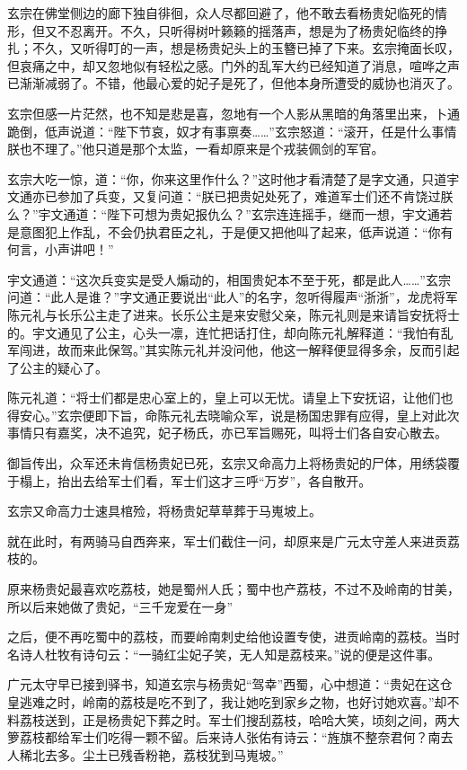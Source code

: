 \documentclass[12pt,oneside]{book}
\begin{document}
玄宗在佛堂侧边的廊下独自徘徊，众人尽都回避了，他不敢去看杨贵妃临死的情形，但又不忍离开。不久，只听得树叶籁籁的摇落声，想是为了杨贵妃临终的挣扎；不久，又听得叮的一声，想是杨贵妃头上的玉簪已掉了下来。玄宗掩面长叹，但哀痛之中，却又忽地似有轻松之感。门外的乱军大约已经知道了消息，喧哗之声已渐渐减弱了。不错，他最心爱的妃子是死了，但他本身所遭受的威协也消灭了。

玄宗但感一片茫然，也不知是悲是喜，忽地有一个人影从黑暗的角落里出来，卜通跪倒，低声说道：``陛下节哀，奴才有事禀奏\ldots\ldots{}''玄宗怒道：``滚开，任是什么事情朕也不理了。''他只道是那个太监，一看却原来是个戎装佩剑的军官。

玄宗大吃一惊，道：``你，你来这里作什么？''这时他才看清楚了是字文通，只道宇文通亦已参加了兵变，又复问道：``朕已把贵妃处死了，难道军士们还不肯饶过朕么？''宇文通道：``陛下可想为贵妃报仇么？''玄宗连连摇手，继而一想，宇文通若是意图犯上作乱，不会仍执君臣之礼，于是便又把他叫了起来，低声说道：``你有何言，小声讲吧！''

宇文通道：``这次兵变实是受人煽动的，相国贵妃本不至于死，都是此人\ldots\ldots{}''玄宗问道：``此人是谁？''字文通正要说出``此人''的名字，忽听得履声``浙浙''，龙虎将军陈元礼与长乐公主走了进来。长乐公主是来安慰父亲，陈元礼则是来请旨安抚将士的。宇文通见了公主，心头一凛，连忙把话打住，却向陈元礼解释道：``我怕有乱军闯进，故而来此保驾。''其实陈元礼并没问他，他这一解释便显得多余，反而引起了公主的疑心了。

陈元礼道：``将士们都是忠心室上的，皇上可以无忧。请皇上下安抚诏，让他们也得安心。''玄宗便即下旨，命陈元礼去晓喻众军，说是杨国忠罪有应得，皇上对此次事情只有嘉奖，决不追究，妃子杨氏，亦已军旨赐死，叫将士们各自安心散去。

御旨传出，众军还未肯信杨贵妃已死，玄宗又命高力上将杨贵妃的尸体，用绣袋覆于榻上，抬出去给军士们看，军士们这才三呼``万岁''，各自散开。

玄宗又命高力士速具棺殓，将杨贵妃草草葬于马嵬坡上。

就在此时，有两骑马自西奔来，军士们截住一问，却原来是广元太守差人来进贡荔枝的。

原来杨贵妃最喜欢吃荔枝，她是蜀州人氏；蜀中也产荔枝，不过不及岭南的甘美，所以后来她做了贵妃，``三千宠爱在一身''

之后，便不再吃蜀中的荔枝，而要岭南刺史给他设置专使，进贡岭南的荔枝。当时名诗人杜牧有诗句云：``一骑红尘妃子笑，无人知是荔枝来。''说的便是这件事。

广元太守早已接到驿书，知道玄宗与杨贵妃``驾幸''西蜀，心中想道：``贵妃在这仓皇逃难之时，岭南的荔枝是吃不到了，我让她吃到家乡之物，也好讨她欢喜。''却不料荔枝送到，正是杨贵妃下葬之时。军士们搜刮荔枝，哈哈大笑，顷刻之间，两大箩荔枝都给军士们吃得一颗不留。后来诗人张佑有诗云：``旌旗不整奈君何？南去人稀北去多。尘土已残香粉艳，荔枝犹到马嵬坡。''
\end{document}
